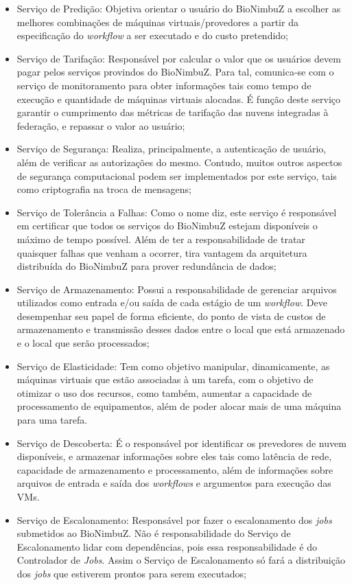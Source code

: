 	\begin{itemize}
		\item Serviço de Predição: Objetiva orientar o usuário do BioNimbuZ a escolher as melhores combinações de máquinas virtuais/provedores a partir da especificação do \textit{workflow} a ser executado e do custo pretendido;
		\item Serviço de Tarifação: Responsável por calcular o valor que os usuários devem pagar pelos serviços provindos do BioNimbuZ. Para tal, comunica-se com o serviço de monitoramento para obter informações tais como tempo de execução e quantidade de máquinas virtuais alocadas. É função deste serviço garantir o cumprimento das métricas de tarifação das nuvens integradas à federação, e repassar o valor ao usuário;
		\item Serviço de Segurança: Realiza, principalmente, a autenticação de usuário, além de verificar as autorizações do mesmo. Contudo, muitos outros aspectos de segurança computacional podem ser implementados por este serviço, tais como criptografia na troca de mensagens;
		\item Serviço de Tolerância a Falhas: Como o nome diz, este serviço é responsável em certificar que todos os serviços do BioNimbuZ estejam disponíveis o máximo de tempo possível. Além de ter a responsabilidade de tratar quaisquer falhas que venham a ocorrer, tira vantagem da arquitetura distribuída do BioNimbuZ para prover redundância de dados;
		\item Serviço de Armazenamento: Possui a responsabilidade de gerenciar arquivos utilizados como entrada e/ou saída de cada estágio de um \textit{workflow}. Deve desempenhar seu papel de forma eficiente, do ponto de vista de custos de armazenamento e transmissão desses dados entre o local que está armazenado e o local que serão processados;
		\item Serviço de Elasticidade: Tem como objetivo manipular, dinamicamente, as máquinas virtuais que estão associadas à um tarefa, com o objetivo de otimizar o uso dos recursos, como também, aumentar a capacidade de processamento de equipamentos, além de poder alocar mais de uma máquina para uma tarefa.
		\item Serviço de Descoberta: É o responsável por identificar os prevedores de nuvem disponíveis, e armazenar informações sobre eles tais como latência de rede, capacidade de armazenamento e processamento, além de informações sobre arquivos de entrada e saída dos \textit{workflows} e argumentos para execução das \acrshort{VM}s.
		\item Serviço de Escalonamento: Responsável por fazer o escalonamento dos \textit{jobs} submetidos ao BioNimbuZ. Não é responsabilidade do Serviço de Escalonamento lidar com dependências, pois essa responsabilidade é do Controlador de \textit{Jobs}. Assim o Serviço de Escalonamento só fará a distribuição dos \textit{jobs} que estiverem prontos para serem executados;

\end{itemize}
